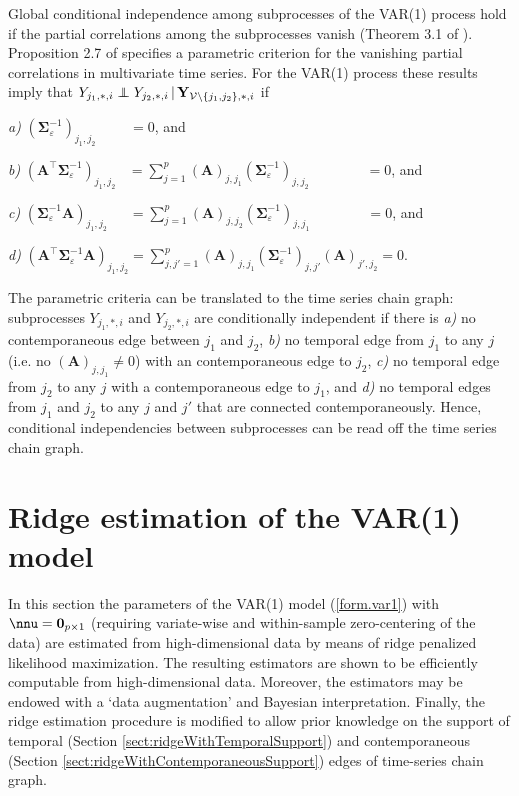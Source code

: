 Global conditional independence among subprocesses of the VAR(1) process hold if the partial correlations among the subprocesses vanish (Theorem 3.1 of \cite{Dahlhaus2003}). Proposition 2.7 of \cite{Dahlhaus2003} specifies a parametric criterion for the vanishing partial correlations in multivariate time series. For the VAR(1) process these results imply that $Y_{j_1, \ast, i} \independent Y_{j_2, \ast, i} \, | \, \mathbf{Y}_{\mathcal{V} \setminus \{j_1, j_2\}, \ast, i}$ if
\begin{compactitem}
\item[\textit{a)}] $(\mathbf{\Sigma}_{\varepsilon}^{-1})_{j_1, j_2} \qquad  \, \, = 0$, and
\item[\textit{b)}] $(\mathbf{A}^{\top}  \mathbf{\Sigma}_{\varepsilon}^{-1})_{j_1, j_2}  \, \, \, \, \,
= \sum_{j=1}^p (\mathbf{A})_{j, j_1}  (\mathbf{\Sigma}_{\varepsilon}^{-1})_{j, j_2} \qquad \qquad  = 0$, and
\item[\textit{c)}] $(\mathbf{\Sigma}_{\varepsilon}^{-1} \mathbf{A})_{j_1, j_2} \quad \, \, \, = \sum_{j=1}^p (\mathbf{A})_{j, j_2} (\mathbf{\Sigma}_{\varepsilon}^{-1})_{j, j_1} \qquad \qquad = 0$, and
\item[\textit{d)}] $(\mathbf{A}^{\top} \mathbf{\Sigma}_{\varepsilon}^{-1} \mathbf{A})_{j_1, j_2}  = \sum_{j, j'=1}^p (\mathbf{A})_{j, j_1} (\mathbf{\Sigma}_{\varepsilon}^{-1})_{j, j'} (\mathbf{A})_{j', j_2} = 0$.
\end{compactitem}
The parametric criteria can be translated to the time series chain graph: subprocesses $Y_{j_1, \ast, i}$ and $Y_{j_2, \ast, i}$ are conditionally independent if there is \textit{a)} no contemporaneous edge between $j_1$ and $j_2$, \textit{b)} no temporal edge from $j_1$ to any $j$ (i.e. no $(\mathbf{A})_{j, j_1} \not= 0$) with an contemporaneous edge to $j_2$, \textit{c)} no temporal edge from $j_2$ to any $j$ with a contemporaneous edge to $j_1$, and \textit{d)} no temporal edges from $j_1$ and $j_2$ to any $j$ and $j'$ that are connected contemporaneously. Hence, conditional independencies between subprocesses can be read off the time series chain graph.

\section{Ridge estimation of the VAR(1) model} \label{sect:ridgeEstimation}

In this section the parameters of the VAR(1) model (\ref{form.var1}) with $\nnu = \mathbf{0}_{p \times 1}$ (requiring variate-wise and within-sample zero-centering of the data) are estimated from high-dimensional data by means of ridge penalized likelihood maximization. The resulting estimators are shown to be efficiently computable from high-dimensional data. Moreover, the estimators may be endowed with a `data augmentation' and Bayesian interpretation. Finally, the ridge estimation procedure is modified to allow prior knowledge on the support of temporal (Section \ref{sect:ridgeWithTemporalSupport}) and contemporaneous (Section \ref{sect:ridgeWithContemporaneousSupport}) edges of time-series chain graph.

